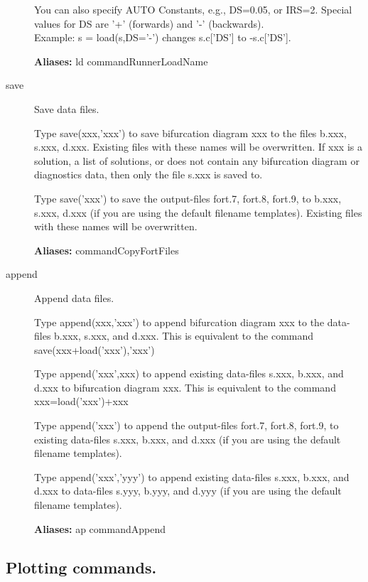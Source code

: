 \documentclass[12pt]{report}
\begin{document}
\begin{description}
    You can also specify AUTO Constants, e.g., DS=0.05, or IRS=2.
    Special values for DS are '+' (forwards) and '-' (backwards).\\
    Example: s = load(s,DS='-') changes s.c['DS'] to -s.c['DS'].

    \textbf{Aliases:} ld commandRunnerLoadName

\item[save]
Save data files.

    Type save(xxx,'xxx') to save bifurcation diagram xxx
    to the files b.xxx, s.xxx, d.xxx. 
    Existing files with these names will be overwritten.
    If xxx is a solution, a list of solutions, or does not contain any
    bifurcation diagram or diagnostics data, then only the file s.xxx
    is saved to.

    Type save('xxx') to save the output-files fort.7, fort.8, fort.9,
    to b.xxx, s.xxx, d.xxx (if you are using the default filename
    templates).  Existing files with these names will be overwritten.

\textbf{Aliases:} commandCopyFortFiles

\item[append]

Append data files.

    Type append(xxx,'xxx') to append bifurcation diagram xxx
    to the data-files b.xxx, s.xxx, and d.xxx. This is equivalent to
    the command\\
    save(xxx+load('xxx'),'xxx')

    Type append('xxx',xxx) to append existing data-files s.xxx, b.xxx,
    and d.xxx to bifurcation diagram xxx. This is equivalent to
    the command\\
    xxx=load('xxx')+xxx

    Type append('xxx') to append the output-files fort.7, fort.8,
    fort.9, to existing data-files s.xxx, b.xxx, and d.xxx (if you are
    using the default filename templates).

    Type append('xxx','yyy') to append existing data-files s.xxx, b.xxx,
    and d.xxx to data-files s.yyy, b.yyy, and d.yyy (if you are using
    the default filename templates).

    \textbf{Aliases:} ap commandAppend
\end{description}

\subsection{Plotting commands.} \label{sec:clui_ref_plot}
\end{document}

